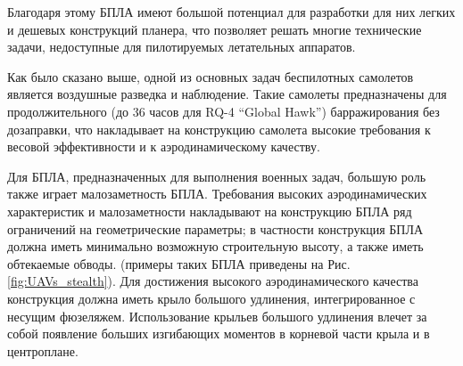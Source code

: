 

Благодаря этому БПЛА имеют большой потенциал для разработки для них легких и дешевых конструкций планера, что позволяет решать многие технические задачи, недоступные для пилотируемых летательных аппаратов.







Как было сказано выше, одной из основных задач беспилотных самолетов является воздушные разведка и наблюдение. Такие самолеты предназначены для продолжительного (до 36 часов для RQ-4 ``Global Hawk'') барражирования без дозаправки, что накладывает на конструкцию самолета высокие требования к весовой эффективности и к аэродинамическому качеству.




Для БПЛА, предназначенных для выполнения военных задач, большую роль также играет малозаметность БПЛА. Требования высоких аэродинамических характеристик и малозаметности накладывают на конструкцию БПЛА ряд ограничений на геометрические параметры; в частности конструкция БПЛА должна иметь минимально возможную строительную высоту, а также иметь обтекаемые обводы. (примеры таких БПЛА приведены на Рис.\ref{fig:UAVs_stealth}). Для достижения высокого аэродинамического качества  конструкция должна иметь крыло большого удлинения, интегрированное с несущим фюзеляжем. Использование крыльев большого удлинения влечет за собой появление больших изгибающих моментов в корневой части крыла и в центроплане. 


